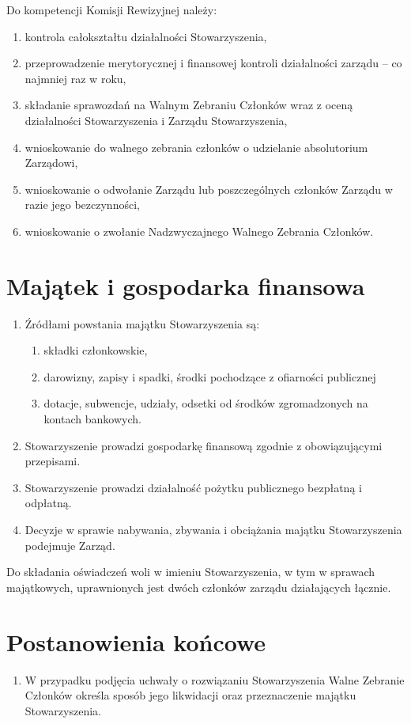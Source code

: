 \documentclass{article}
\begin{document}
Do kompetencji Komisji Rewizyjnej należy:
\begin{enumerate}
\item
  kontrola całokształtu działalności Stowarzyszenia,
\item
  przeprowadzenie merytorycznej i finansowej kontroli działalności zarządu -- co najmniej raz w roku,
\item
  składanie sprawozdań na Walnym Zebraniu Członków wraz z oceną działalności Stowarzyszenia i Zarządu Stowarzyszenia,
\item
  wnioskowanie do walnego zebrania członków o udzielanie absolutorium Zarządowi,
\item
  wnioskowanie o odwołanie Zarządu lub poszczególnych członków Zarządu w razie jego bezczynności,
\item
  wnioskowanie o zwołanie Nadzwyczajnego Walnego Zebrania Członków.
\end{enumerate}

\section{Majątek i gospodarka finansowa}
\begin{enumerate}
\item
  Źródłami powstania majątku Stowarzyszenia są:
  \begin{enumerate}
  \def\labelenumii{\alph{enumii}.}
  \item
    składki członkowskie,
  \item
    darowizny, zapisy i spadki, środki pochodzące z ofiarności publicznej
  \item
    dotacje, subwencje, udziały, odsetki od środków zgromadzonych na kontach bankowych.
  \end{enumerate}
\item
  Stowarzyszenie prowadzi gospodarkę finansową zgodnie z obowiązującymi przepisami.
\item
  Stowarzyszenie prowadzi działalność pożytku publicznego bezpłatną i odpłatną.
\item
  Decyzje w sprawie nabywania, zbywania i obciążania majątku Stowarzyszenia podejmuje Zarząd.
\end{enumerate}

Do składania oświadczeń woli w imieniu Stowarzyszenia, w tym w sprawach majątkowych, uprawnionych jest dwóch członków zarządu działających łącznie.

\section{Postanowienia końcowe}
\begin{enumerate}
\item
  W przypadku podjęcia uchwały o rozwiązaniu Stowarzyszenia Walne Zebranie Członków określa sposób jego likwidacji oraz przeznaczenie majątku Stowarzyszenia.
\end{enumerate}
\end{document}
